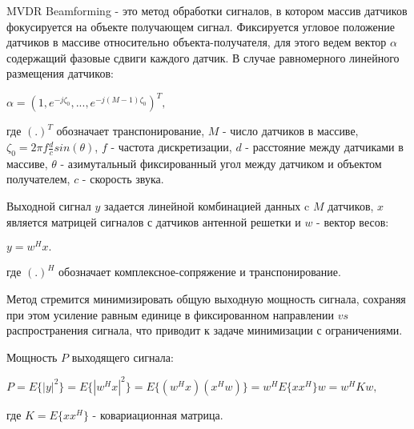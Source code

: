 \documentclass[a4paper,12pt]{report}
\begin{document}
	MVDR Beamforming - это метод обработки сигналов, в котором массив датчиков фокусируется на объекте получающем сигнал. Фиксируется угловое положение датчиков в массиве относительно объекта-получателя, для этого ведем вектор $\alpha$ содержащий фазовые сдвиги каждого датчик. В случае равномерного линейного размещения датчиков:
	\begin{center}
		$ \alpha = (1, e^{-j\zeta_0},..., e^{-j(M-1)\zeta_0})^T,$
	\end{center}
	где $(.)^T$ обозначает транспонирование, $M$ - число датчиков в массиве, $\zeta_0 = 2\pi f \frac{d}{c} sin(\theta)$, $f$ - частота дискретизации, $d$ - расстояние между датчиками в массиве, $\theta$ - азимутальный фиксированный угол между датчиком и объектом получателем, $c$ - скорость звука.
	
	Выходной сигнал $y$ задается линейной комбинацией данных c $M$ датчиков, $x$ является матрицей сигналов с датчиков антенной решетки и $w$ - вектор весов: 
	\begin{center}
			$y = w^Hx.$
	\end{center}
	где $(.)^H$ обозначает комплексное-сопряжение и транспонирование.
	 
  	Метод стремится минимизировать общую выходную мощность сигнала, сохраняя при этом усиление равным единице в фиксированном направлении $vs$ распространения сигнала, что приводит к задаче минимизации с ограничениями.
	
	Мощность $P$ выходящего сигнала:
	\begin{center}
		$P = E\{|y|^2\} = E\{|w^Hx|^2\} = E\{(w^Hx)(x^Hw)\} = w^HE\{xx^H\}w = w^HKw,$
	\end{center}
	где $K = E\{xx^H\}$ - ковариационная матрица.
	
\end{document}
